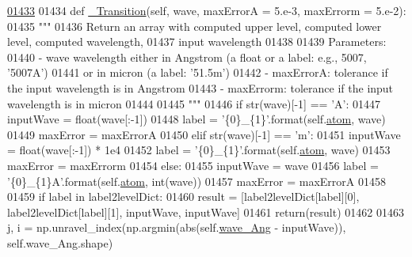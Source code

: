 \begin{DoxyCode}
\hypertarget{classpyneb_1_1core_1_1pynebcore_1_1_atom_l01433}{}\hyperlink{classpyneb_1_1core_1_1pynebcore_1_1_atom_a69f29cc10c77910841f9e3ff8ddef250}{01433} 
01434     \textcolor{keyword}{def }\hyperlink{classpyneb_1_1core_1_1pynebcore_1_1_atom_a69f29cc10c77910841f9e3ff8ddef250}{\_Transition}(self, wave, maxErrorA = 5.e-3, maxErrorm = 5.e-2):
01435         \textcolor{stringliteral}{"""}
01436 \textcolor{stringliteral}{        Return an array with computed upper level, computed lower level, computed wavelength, }
01437 \textcolor{stringliteral}{            input wavelength}
01438 \textcolor{stringliteral}{        }
01439 \textcolor{stringliteral}{        Parameters:}
01440 \textcolor{stringliteral}{            - wave       wavelength either in Angstrom (a float or a label: e.g., 5007, '5007A') }
01441 \textcolor{stringliteral}{                            or in micron (a label: '51.5m')}
01442 \textcolor{stringliteral}{            - maxErrorA: tolerance if the input wavelength is in Angstrom}
01443 \textcolor{stringliteral}{            - maxErrorm: tolerance if the input wavelength is in micron}
01444 \textcolor{stringliteral}{                            }
01445 \textcolor{stringliteral}{        """}
01446         \textcolor{keywordflow}{if} str(wave)[-1] == \textcolor{stringliteral}{'A'}:
01447             inputWave = float(wave[:-1])
01448             label = \textcolor{stringliteral}{'\{0\}\_\{1\}'}.format(self.\hyperlink{classpyneb_1_1core_1_1pynebcore_1_1_atom_a192f3e20446d7fba81d789bc705d6c71}{atom}, wave)
01449             maxError = maxErrorA
01450         \textcolor{keywordflow}{elif} str(wave)[-1] == \textcolor{stringliteral}{'m'}:
01451             inputWave = float(wave[:-1]) * 1e4
01452             label = \textcolor{stringliteral}{'\{0\}\_\{1\}'}.format(self.\hyperlink{classpyneb_1_1core_1_1pynebcore_1_1_atom_a192f3e20446d7fba81d789bc705d6c71}{atom}, wave)
01453             maxError = maxErrorm
01454         \textcolor{keywordflow}{else}:
01455             inputWave = wave
01456             label = \textcolor{stringliteral}{'\{0\}\_\{1\}A'}.format(self.\hyperlink{classpyneb_1_1core_1_1pynebcore_1_1_atom_a192f3e20446d7fba81d789bc705d6c71}{atom}, int(wave))
01457             maxError = maxErrorA
01458             
01459         \textcolor{keywordflow}{if} label \textcolor{keywordflow}{in} label2levelDict:
01460             result = [label2levelDict[label][0], label2levelDict[label][1], inputWave, inputWave]
01461             return(result)
01462         
01463         j, i = np.unravel\_index(np.argmin(abs(self.\hyperlink{classpyneb_1_1core_1_1pynebcore_1_1_atom_a044e1349bb63766a5f3d25fbf04b5c2c}{wave\_Ang} - inputWave)), self.wave\_Ang.shape)

\end{DoxyCode}
